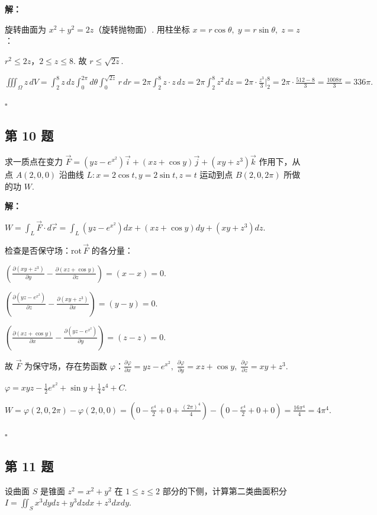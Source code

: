 \documentclass[12pt,a4paper]{article}
\newenvironment{sol}[1][解]{%
  \par\medskip\noindent\textbf{#1：}\itshape\par\noindent\ignorespaces
}{%
  \par\hfill$\square$\par\medskip
}
\begin{document}
\begin{sol}旋转曲面为 $x^2+y^2=2z$（旋转抛物面）. 用柱坐标 $x=r\cos\theta,\;
  y=r\sin\theta,\; z=z$：

  $r^2\le 2z$，$2\le z\le 8$. 故 $r\le\sqrt{2z}$.

  $\iiint_{\Omega}z\,dV=\int_2^8
  z\,dz\int_0^{2\pi}d\theta\int_0^{\sqrt{2z}}r\,dr=2\pi\int_2^8 z\cdot
  z\,dz=2\pi\int_2^8
  z^2\,dz=2\pi\cdot\frac{z^3}{3}\Big|_2^8=2\pi\cdot\frac{512-8}{3}=\frac{1008\pi}{3}=336\pi.$

\end{sol}
\subsection*{第 10 题}
求一质点在变力 $\vec{F}=(yz-e^{x^2})\vec{i}+(xz+\cos
y)\vec{j}+(xy+z^3)\vec{k}$ 作用下，从点 $A(2,0,0)$ 沿曲线 $L: x=2\cos t,
y=2\sin t, z=t$ 运动到点 $B(2,0,2\pi)$ 所做的功 $W$.

\begin{sol}$W=\int_L\vec{F}\cdot
  d\vec{r}=\int_L(yz-e^{x^2})dx+(xz+\cos y)dy+(xy+z^3)dz$.

  检查是否保守场：$\text{rot}\,\vec{F}$ 的各分量：

  $(\frac{\partial(xy+z^3)}{\partial y}-\frac{\partial(xz+\cos
  y)}{\partial z})=(x-x)=0.$

  $(\frac{\partial(yz-e^{x^2})}{\partial
  z}-\frac{\partial(xy+z^3)}{\partial x})=(y-y)=0.$

  $(\frac{\partial(xz+\cos y)}{\partial
  x}-\frac{\partial(yz-e^{x^2})}{\partial y})=(z-z)=0.$

  故 $\vec{F}$ 为保守场，存在势函数 $\varphi$：$\frac{\partial\varphi}{\partial
  x}=yz-e^{x^2},\;\frac{\partial\varphi}{\partial y}=xz+\cos
  y,\;\frac{\partial\varphi}{\partial z}=xy+z^3$.

  $\varphi=xyz-\frac{1}{2}e^{x^2}+\sin y+\frac{1}{4}z^4+C$.

  $W=\varphi(2,0,2\pi)-\varphi(2,0,0)=(0-\frac{e^4}{2}+0+\frac{(2\pi)^4}{4})-(0-\frac{e^4}{2}+0+0)=\frac{16\pi^4}{4}=4\pi^4.$

\end{sol}
\subsection*{第 11 题}
设曲面 $S$ 是锥面 $z^2=x^2+y^2$ 在 $1\le z\le 2$ 部分的下侧，计算第二类曲面积分
$I=\iint_{S}x^3dydz+y^3dzdx+z^3dxdy$.
\end{document}

